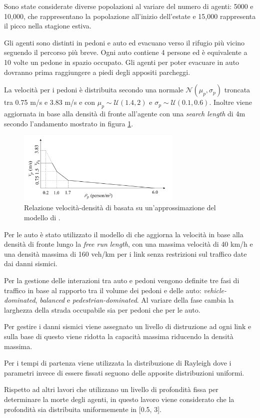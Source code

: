 Sono state considerate diverse popolazioni al variare del numero di agenti: 5000 e 10,000,
che rappresentano la popolazione all'inizio dell'estate e 15,000 rappresenta il picco nella stagione estiva.

Gli agenti sono distinti in pedoni e auto ed evacuano verso il rifugio più vicino seguendo il percorso più breve.
Ogni auto contiene 4 persone ed è equivalente a 10 volte un pedone in spazio occupato.
Gli agenti per poter evacuare in auto dovranno prima raggiungere a piedi degli appositi parcheggi.

La velocità per i pedoni è distribuita secondo una normale $\mathcal{N}(\mu_p,\sigma_p)$ troncata tra 0.75 m/s e 3.83 m/s e
con $\mu_p \sim \mathcal{U}(1.4, 2)$ e $\sigma_p \sim \mathcal{U}(0.1, 0.6)$.
Inoltre viene aggiornata in base alla densità di fronte all'agente con una \textit{search length} di 4m secondo l'andamento mostrato in figura \ref{fig:wang2021}.

\begin{figure}[ht]
    \centering
    \includegraphics[width=0.7\textwidth]{images/speed_WANG.png}
    \caption{Relazione velocità-densità di \textcite{wang2021novel} basata su un'approssimazione del modello di \textcite{goto2012tsunami}.}
    \label{fig:wang2021}
\end{figure}

Per le auto è stato utilizzato il modello di \textcite{greenshields1935study} che aggiorna la velocità in base alla densità di fronte lungo la \textit{free run length},
con una massima velocità di 40 km/h e una densità massima di 160 veh/km per i link senza restrizioni sul traffico date dai danni sismici.

Per la gestione delle interazioni tra auto e pedoni vengono definite tre fasi di traffico in base al rapporto
tra il volume dei pedoni e delle auto: \textit{vehicle-dominated}, \textit{balanced} e \textit{pedestrian-dominated}.
Al variare della fase cambia la larghezza della strada occupabile sia per pedoni che per le auto.

Per gestire i danni sismici viene assegnato un livello di distruzione ad ogni link e sulla base di questo viene 
ridotta la capacità massima riducendo la densità massima.

Per i tempi di partenza viene utilizzata la distribuzione di Rayleigh dove i parametri
invece di essere fissati seguono delle apposite distribuzioni uniformi.

Rispetto ad altri lavori che utilizzano un livello di profondità fissa per determinare la morte degli agenti, in questo lavoro
viene considerato che la profondità sia distribuita uniformemente in [0.5, 3]. 

